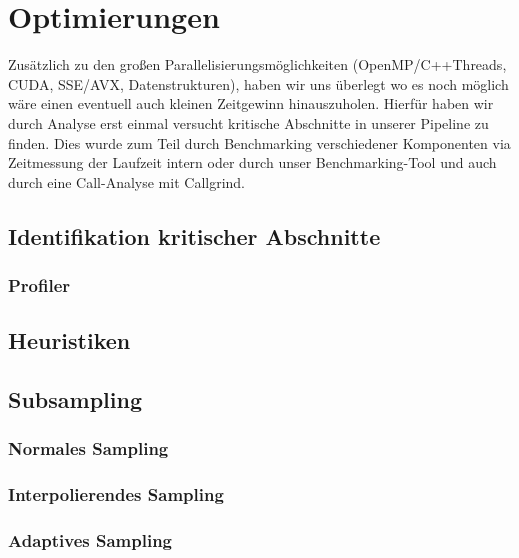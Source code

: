 \section{Optimierungen}
Zusätzlich zu den großen Parallelisierungsmöglichkeiten (OpenMP/C++Threads, CUDA, SSE/AVX, Datenstrukturen), haben wir uns überlegt wo es noch möglich wäre einen eventuell auch kleinen Zeitgewinn hinauszuholen.
Hierfür haben wir durch Analyse erst einmal versucht kritische Abschnitte in unserer Pipeline zu finden. Dies wurde zum Teil durch Benchmarking verschiedener Komponenten via Zeitmessung der Laufzeit intern oder durch unser Benchmarking-Tool und auch durch eine Call-Analyse mit Callgrind.

\subsection{Identifikation kritischer Abschnitte}
\subsubsection{Profiler}

\subsection{Heuristiken}

\subsection{Subsampling}
\subsubsection{Normales Sampling}
\subsubsection{Interpolierendes Sampling}
\subsubsection{Adaptives Sampling}
